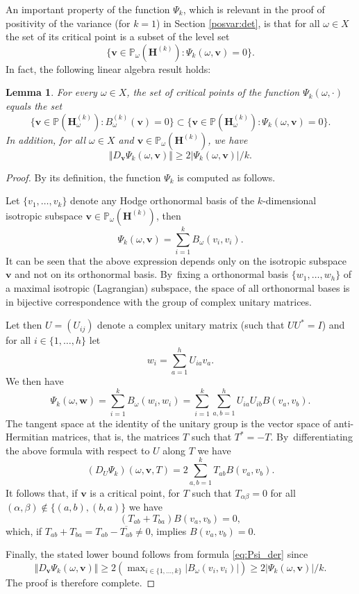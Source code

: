 \documentclass[10pt]{amsart}
\let\sep:
\theoremstyle{plain}
\newtheorem{lemma}[thm]{Lemma}
\theoremstyle{definition}
\numberwithin{equation}{subsection}
\newcommand\bP{\mathbb{P}}
\newcommand{\bfH}{\boldsymbol{H}}
\newcommand{\bfv}{\boldsymbol{v}}
\newcommand{\bfw}{\boldsymbol{w}}
\begin{document}
An important property of the function $\Psi_k$, which is relevant in the proof of \hbox{positivity} of the variance (for $k=1$)
in Section \ref{posvar:det}, is that for all $\omega \in X$ the set of its critical point is a subset of the level set
\[
\{\bfv \in \bP_\omega(\bfH^{(k)}) \sep \Psi_k(\omega, \bfv)=0\}.
\]
In fact, the following linear algebra result holds:
\begin{lemma}
\label{lemma:crit}
For every $\omega \in X$, the set of critical points of the function $\Psi_k(\omega, \cdot)$ equals the set
\[
\{ \bfv \in \bP(\bfH_\omega^{(k)}) \sep B^{(k)}_\omega(\bfv)=0\} \subset \{\bfv \in \bP(\bfH_\omega^{(k)}) \sep \Psi_k(\omega, \bfv)=0\}.
\]
In addition, for all $\omega \in X$ and
$\bfv \in \bP_\omega (\bfH^{(k)})$, we have
\[
\Vert D_{ \bfv }\Psi_k(\omega, \bfv) \Vert\geq 2 \vert \Psi_k(\omega, \bfv)\vert/k.
\]
\end{lemma}
\begin{proof}
By its definition, the function $\Psi_k$ is computed as follows.

Let $\{v_1, \dots, v_k\}$ denote any Hodge orthonormal
basis of the $k$-dimensional isotropic subspace $\bfv \in \bP_\omega(\bfH^{(k)}) $, then
\[
\Psi_k(\omega, \bfv) = \sum_{i=1}^k B_\omega(v_i, v_i).
\]
It can be seen that the above expression depends only on the isotropic subspace $\bfv$ and not on its orthonormal basis. By~fixing a orthonormal basis $\{w_1, \dots, w_h\}$
of a maximal isotropic (Lagrangian) subspace, the space of all orthonormal bases is in bijective correspondence with the group
of complex unitary matrices.

Let then $U =(U_{ij})$ denote a complex unitary matrix (such that $UU^*=I$) and for all $i\in \{1, \dots, h\}$ let
\[
w_i = \sum_{a=1}^h U_{ia} v_a.
\]
We then have
\[
\Psi_k(\omega, \bfw) =
\sum_{i=1}^k B_\omega(w_i, w_i) = \sum_{i=1}^k
\sum_{a,b=1}^h U_{ia} U_{ib} B(v_a, v_b).
\]
The tangent space at the identity of the unitary group is the vector space of anti-Hermitian matrices, that is, the matrices
$T$ such that $T^* = -T$. By~differentiating the above formula
with respect to $U$ along $T$ we have
\begin{equation}
\label{eq:Psi_der}
(D_U\Psi_k)(\omega, \bfv, T)= 2
\sum_{a,b=1}^k T_{ab} B(v_a, v_b).
\end{equation}
It follows that, if $\bfv$ is a critical point,
for $T$ such that $T_{\alpha\beta}=0$ for all $(\alpha,\beta) \not\in \{(a,b), (b,a)\}$ we have
\[
(T_{ab} + T_{ba}) B(v_a, v_b) =0,
\]
which, if $T_{ab} + T_{ba}= T_{ab} - \overline{T_{ab}}\not=0$,
implies $B(v_a, v_b)=0$.

Finally, the stated lower bound follows
from formula \eqref{eq:Psi_der} since
\[
\Vert D_{ \bfv }\Psi_k(\omega, \bfv) \Vert\geq 2 (\max\nolimits_{i\in \{1, \dots, k\}} \vert B_\omega(v_i,v_i)\vert) \geq 2 \vert \Psi_k (\omega, \bfv) \vert /k.
\]
The proof is therefore complete.
\end{proof}
\end{document}
